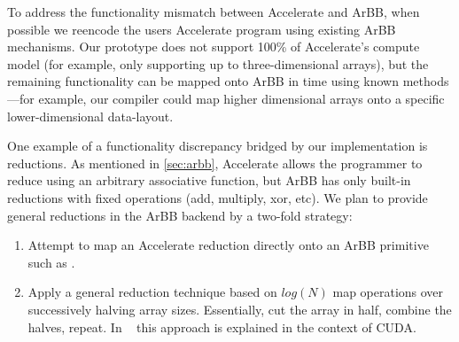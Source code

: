 To address the functionality mismatch between Accelerate and ArBB,
when possible we reencode the users Accelerate program using existing
ArBB mechanisms.  Our prototype does not support 100\% of Accelerate's
compute model (for example, only supporting  up to three-dimensional
arrays), but the remaining functionality can be mapped onto ArBB in
time using known methods---for example, our compiler could map higher
dimensional arrays onto a specific lower-dimensional data-layout.

%

One example of a functionality discrepancy bridged by our
implementation is reductions.  As mentioned in \ref{sec:arbb},
Accelerate allows the programmer to reduce using an arbitrary
associative function, but ArBB has only built-in reductions with fixed
operations (add, multiply, xor, etc). We plan to provide general reductions in
the ArBB backend by a two-fold strategy:

\begin{enumerate}
\item Attempt to map an Accelerate reduction directly onto an ArBB
  primitive such as .
\item Apply a general reduction technique based on $log(N)$ map
  operations over successively halving array sizes.  Essentially, cut
  the array in half, combine the halves, repeat. In ~\cite{reduction}
  this approach is explained in the context of CUDA. 
\end{enumerate}


